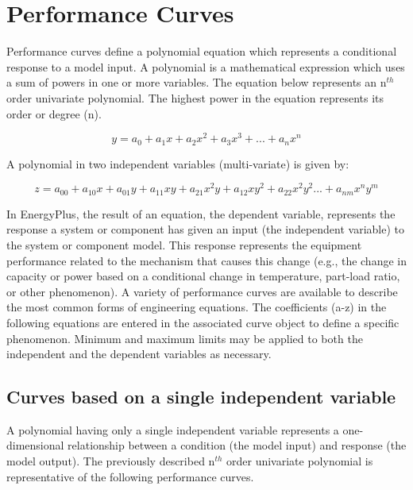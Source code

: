 \section{Performance Curves}\label{performance-curves-000}

Performance curves define a polynomial equation which represents a conditional response to a model input. A polynomial is a mathematical expression which uses a sum of powers in one or more variables. The equation below represents an n\(^{th}\) order univariate polynomial. The highest power in the equation represents its order or degree (n).

\begin{equation}
y = {a_0} + {a_1}x + {a_2}{x^2} + {a_3}{x^3} + ... + {a_n}{x^n}
\end{equation}

A polynomial in two independent variables (multi-variate) is given by:

\begin{equation}
z = {a_{00}} + {a_{10}}x + {a_{01}}y + {a_{11}}xy + {a_{21}}{x^2}y + {a_{12}}x{y^2} + {a_{22}}{x^2}{y^2}... + {a_{nm}}{x^n}{y^m}
\end{equation}

In EnergyPlus, the result of an equation, the dependent variable, represents the response a system or component has given an input (the independent variable) to the system or component model. This response represents the equipment performance related to the mechanism that causes this change (e.g., the change in capacity or power based on a conditional change in temperature, part-load ratio, or other phenomenon). A variety of performance curves are available to describe the most common forms of engineering equations. The coefficients (a-z) in the following equations are entered in the associated curve object to define a specific phenomenon. Minimum and maximum limits may be applied to both the independent and the dependent variables as necessary.

\subsection{Curves based on a single independent variable}\label{curves-based-on-a-single-independent-variable}

A polynomial having only a single independent variable represents a one-dimensional relationship between a condition (the model input) and response (the model output). The previously described n\(^{th}\) order univariate polynomial is representative of the following performance curves.

